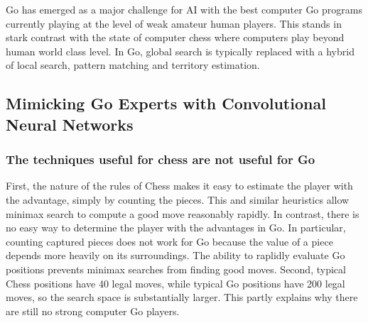 Go has emerged as a major challenge for AI with the best computer Go programs currently playing at the level of weak amateur human players. This stands in stark contrast with the state of computer chess where computers play beyond human world class level. In Go, global search is typically replaced with a hybrid of local search, pattern matching and territory estimation.
%
%
\subsection{Mimicking Go Experts with Convolutional Neural Networks~\cite{sutskever2008mimicking}}
\subsubsection{The techniques useful for chess are not useful for Go}
First, the nature of the rules of Chess makes it easy to estimate the player with the advantage, simply by counting the pieces. This and similar heuristics allow minimax search to compute a good move reasonably rapidly. In contrast, there is no easy way to determine the player with the advantages in Go. In particular, counting captured pieces does not work for Go because the value of a piece depends more heavily on its surroundings. The ability to raplidly evaluate Go positions prevents minimax searches from finding good moves. Second, typical Chess positions have 40 legal moves, while typical Go positions have 200 legal moves, so the search space is substantially larger. This partly explains why there are still no strong computer Go players.
